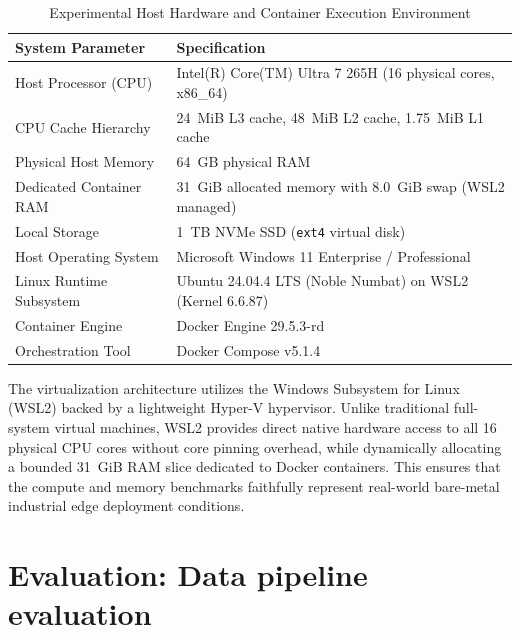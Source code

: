\begin{table}[H]
\centering
\small
\caption{Experimental Host Hardware and Container Execution Environment}
\label{tab:test-hardware-environment}
\vspace{0.2cm}
\begin{tabular}{ll}
\toprule
\textbf{System Parameter} & \textbf{Specification} \\
\midrule
Host Processor (CPU)      & Intel(R) Core(TM) Ultra 7 265H (16 physical cores, x86\_64) \\
CPU Cache Hierarchy       & 24~MiB L3 cache, 48~MiB L2 cache, 1.75~MiB L1 cache \\
Physical Host Memory      & 64~GB physical RAM \\
Dedicated Container RAM   & 31~GiB allocated memory with 8.0~GiB swap (WSL2 managed) \\
Local Storage             & 1~TB NVMe SSD (\texttt{ext4} virtual disk) \\
Host Operating System     & Microsoft Windows 11 Enterprise / Professional \\
Linux Runtime Subsystem   & Ubuntu 24.04.4 LTS (Noble Numbat) on WSL2 (Kernel 6.6.87) \\
Container Engine          & Docker Engine 29.5.3-rd \\
Orchestration Tool        & Docker Compose v5.1.4 \\
\bottomrule
\end{tabular}
\end{table}

The virtualization architecture utilizes the Windows Subsystem for Linux (WSL2) backed by a lightweight Hyper-V hypervisor. Unlike traditional full-system virtual machines, WSL2 provides direct native hardware access to all 16 physical CPU cores without core pinning overhead, while dynamically allocating a bounded 31~GiB RAM slice dedicated to Docker containers. This ensures that the compute and memory benchmarks faithfully represent real-world bare-metal industrial edge deployment conditions.

\clearpage

\section{Evaluation: Data pipeline evaluation}
\label{sec:data_pipeline_evaluation}



